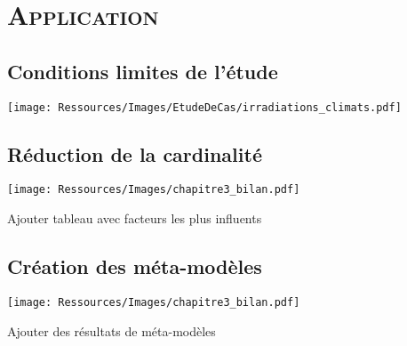 \documentclass[xcolor=x11names, compress, 11pt]{beamer}
\begin{document}
\section{\scshape Application}


\subsection{Conditions limites de l’étude}
\begin{frame}[t]
    \vfill
    \centering
    \texttt{[image: Ressources/Images/EtudeDeCas/irradiations\_climats.pdf]}
    \vfill
\end{frame}


\subsection{Réduction de la cardinalité}
\begin{frame}[t]
    \vfill
    \centering
    \texttt{[image: Ressources/Images/chapitre3\_bilan.pdf]}
    \vfill
\end{frame}

\begin{frame}[c]
    \vfill
    Ajouter tableau avec facteurs les plus influents
    \vfill
\end{frame}


\subsection{Création des méta-modèles}
\begin{frame}[t]
    \vfill
    \centering
    \texttt{[image: Ressources/Images/chapitre3\_bilan.pdf]}
    \vfill
\end{frame}

\begin{frame}[c]
    \vfill
    Ajouter des résultats de méta-modèles
    \vfill
\end{frame}
\end{document}
